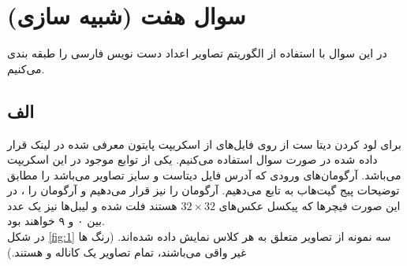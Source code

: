 \documentclass[12pt,onecolumn,a4paper]{article}
\begin{document}
\newpage
\section{سوال هفت (شبیه سازی)}
در این سوال با استفاده از الگوریتم  تصاویر اعداد دست نویس فارسی را طبقه بندی می‌کنیم.
\subsection*{الف}
برای لود کردن دیتا ست از روی فایل‌های  از اسکریپت پایتون معرفی شده در لینک قرار داده شده در صورت سوال استفاده می‌کنیم. یکی از توابع موجود در این اسکریپت  می‌باشد. آرگومان‌های ورودی که آدرس فایل دیتاست و سایز تصاویر می‌باشد را مطابق توضیحات پیج گیت‌هاب به تابع می‌دهیم. آرگومان  را نیز  قرار می‌دهیم و آرگومان  را ، در این صورت فیچرها که پیکسل عکس‌های $32\times 32$ هستند فلت شده و لیبل‌ها نیز یک عدد بین ۰ و ۹ خواهند بود.\\
در شکل \ref{fig:1} سه نمونه از تصاویر متعلق به هر کلاس نمایش داده ‌شده‌اند. (رنگ‌ ها غیر واقی می‌باشند، تمام تصاویر یک کاناله و  هستند.)
\end{document}
